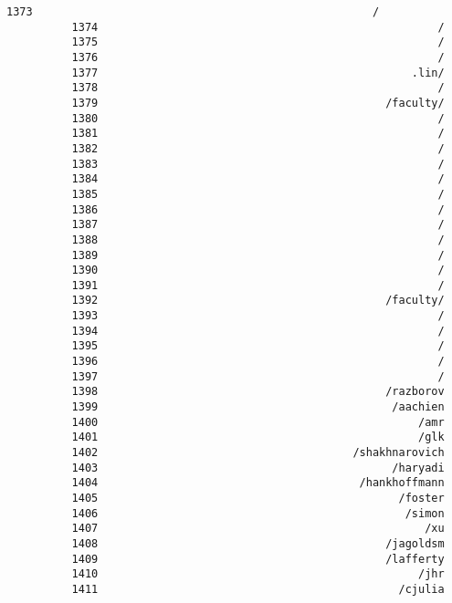 \documentclass[11pt]{article}
\begin{document}
\begin{Verbatim}[commandchars=\\\{\}]
          1373                                                    /
          1374                                                    /
          1375                                                    /
          1376                                                    /
          1377                                                .lin/
          1378                                                    /
          1379                                            /faculty/
          1380                                                    /
          1381                                                    /
          1382                                                    /
          1383                                                    /
          1384                                                    /
          1385                                                    /
          1386                                                    /
          1387                                                    /
          1388                                                    /
          1389                                                    /
          1390                                                    /
          1391                                                    /
          1392                                            /faculty/
          1393                                                    /
          1394                                                    /
          1395                                                    /
          1396                                                    /
          1397                                                    /
          1398                                            /razborov
          1399                                             /aachien
          1400                                                 /amr
          1401                                                 /glk
          1402                                       /shakhnarovich
          1403                                             /haryadi
          1404                                        /hankhoffmann
          1405                                              /foster
          1406                                               /simon
          1407                                                  /xu
          1408                                            /jagoldsm
          1409                                            /lafferty
          1410                                                 /jhr
          1411                                              /cjulia

\end{Verbatim}
\end{document}
